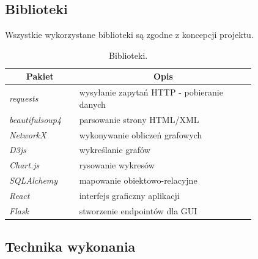 \subsection{Biblioteki}
Wszystkie wykorzystane biblioteki są zgodne z koncepcji projektu.
 \begin{longtable}{| m{0.2\linewidth} |  m{0.6\linewidth} |} 
     \caption{Biblioteki.} \\ 
     \hline
      \multicolumn{1}{|c|}{Pakiet} & \multicolumn{1}{c|}{Opis} \\ \hline \endfirsthead
    
     \endfoot
     \hline \endlastfoot
    \textit{requests} & wysyłanie zapytań HTTP - pobieranie danych \\ \hline
    \textit{beautifulsoup4} & parsowanie strony HTML/XML \\ \hline
    \textit{NetworkX} & wykonywanie obliczeń grafowych \\ \hline
    \textit{D3js} & wykreślanie grafów \\ \hline   
    \textit{Chart.js} & rysowanie wykresów \\ \hline
    \textit{SQLAlchemy} & mapowanie obiektowo-relacyjne \\ \hline
    \textit{React} & interfejs graficzny aplikacji \\ \hline
    \textit{Flask} & stworzenie endpointów dla GUI\\ \hline
\end{longtable}

\subsection{Technika wykonania}
